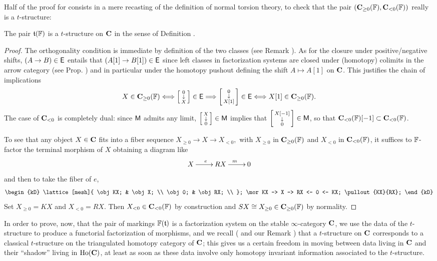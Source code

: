 Half of the proof for \athm {} consists in a mere recasting of the definition of normal torsion theory, to check that the pair $(\mathbf{C}_{\ge 0}(\mathbb{F}),\mathbf{C}_{<0}(\mathbb{F}))$ really is a $t$\hyp{}structure:
\begin{proposition}
The pair $\mathfrak{t}(\mathbb{F})$ is a $t$\hyp{}structure on $\mathbf{C}$ in the sense of Definition .
\end{proposition}
\begin{proof}
The orthogonality condition is immediate by definition of the two classes (see Remark ). As for the closure under positive\fshyp{}negative shifts, $(A\to B)\in\mathsf{E}$ entails that $(A[1]\to B[1])\in\mathsf{E}$ since left classes in factorization systems are closed under (homotopy) colimits in the arrow category (see Prop. ) and in particular under the homotopy pushout defining the shift $A\mapsto A[1]$ on $\mathbf{C}$. This justifies the chain of implications
\[
X\in \mathbf{C}_{\ge 0}(\mathbb{F})  \Longleftrightarrow \left[ \begin{smallmatrix} 0 \\ \downarrow \\ X \end{smallmatrix} \right]\in\mathsf{E}
 \Longrightarrow \left[ \begin{smallmatrix} 0 \\ \downarrow \\ X[1] \end{smallmatrix} \right] \in\mathsf{E} \Longleftrightarrow X[1]\in \mathbf{C}_{\ge 0}(\mathbb{F}) .
\]
The case of $\mathbf{C}_{<0}$ is completely dual: since $\mathsf{M}$ admits any limit, $\left[ \begin{smallmatrix} X \\ \downarrow \\ 0 \end{smallmatrix} \right] \in\mathsf{M}$ implies that $\left[ \begin{smallmatrix} X[-1] \\ \downarrow \\ 0 \end{smallmatrix} \right] \in\mathsf{M}$, so that $\mathbf{C}_{<0}(\mathbb{F})[-1]\subset \mathbf{C}_{<0}(\mathbb{F})$.

To see that any object $X\in \mathbf{C}$ fits into a fiber sequence
$
X_{\geq 0}\to X \to X_{<0},
$
with $X_{\geq 0}$ in $\mathbf{C}_{\geq 0}(\mathbb{F})$ and $X_{< 0}$ in $\mathbf{C}_{< 0}(\mathbb{F})$,
it suffices to $\mathbb{F}$\hyp{}factor the terminal morphism of $X$ obtaining a diagram like
\[
\xymatrix{
X \ar[r]^e & RX \ar[r]^m & 0
}
\]
and then to take the fiber of $e$,
\[
\begin{kD}
\lattice[mesh]{
	\obj KX; & \obj X; \\
	\obj 0; & \obj RX; \\
};
\mor KX -> X -> RX <- 0 <- KX;
\pullout{KX}{RX};
\end{kD}
\]
Set $X_{\geq 0}=KX$ and $X_{<0}=RX$. Then $X_{<0}\in \mathbf{C}_{<0}(\mathbb{F})$ by construction and $SX\cong X_{\geq 0}\in \mathbf{C}_{\geq 0}(\mathbb{F})$ by normality.
\end{proof}
In order to prove, now, that the pair of markings $\mathbb{F}(\mathfrak{t})$ is a factorization system on the stable $\infty$\hyp{}category $\mathbf{C}$, we use the data of the $t$\hyp{}structure to produce a functorial factorization of morphisms, and we recall (\cite[\adef \textbf{1.2.1.4}]{LurieHA} and our Remark ) that a $t$\hyp{}structure on $\mathbf{C}$ corresponds to a classical $t$\hyp{}structure on the triangulated homotopy category of $\mathbf{C}$; this gives us a certain freedom in moving between data living in $\mathbf{C}$ and their ``shadow'' living in $\text{Ho}(\mathbf{C})$, at least as soon as these data involve only homotopy invariant information associated to the $t$\hyp{}structure.

